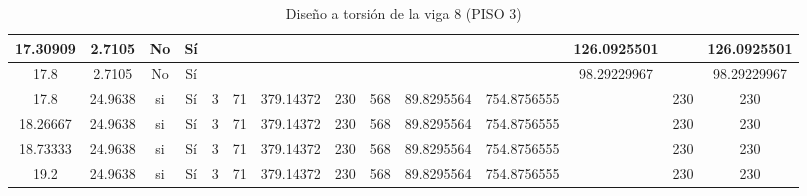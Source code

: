 \begin{table}[H]
{\begin{tabular}{|c|c|c|c|c|c|c|c|c|c|c|c|c|c|}
\hline
17.30909 & 2.7105 & No  & Sí  &     &     &     &     &     &     &     & 126.0925501 &     & 126.0925501 \bigstrut\\
\hline
17.8 & 2.7105 & No  & Sí  &     &     &     &     &     &     &     & 98.29229967 &     & 98.29229967 \bigstrut\\
\hline
17.8 & 24.9638 & si  & Sí  & 3   & 71  & 379.14372 & 230 & 568 & 89.8295564 & 754.8756555 &     & 230 & 230 \bigstrut\\
\hline
18.26667 & 24.9638 & si  & Sí  & 3   & 71  & 379.14372 & 230 & 568 & 89.8295564 & 754.8756555 &     & 230 & 230 \bigstrut\\
\hline
18.73333 & 24.9638 & si  & Sí  & 3   & 71  & 379.14372 & 230 & 568 & 89.8295564 & 754.8756555 &     & 230 & 230 \bigstrut\\
\hline
19.2 & 24.9638 & si  & Sí  & 3   & 71  & 379.14372 & 230 & 568 & 89.8295564 & 754.8756555 &     & 230 & 230 \bigstrut\\
\hline
\end{tabular}%


  }
      \caption{Diseño a torsión de la viga 8 (PISO 3) }
  \label{tab:T VG8 P3 }%
\end{table}%
